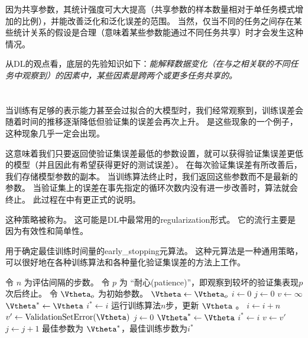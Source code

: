 因为共享参数，其统计强度可大大提高（共享参数的样本数量相对于单任务模式增加的比例），并能改善泛化和泛化误差的范围\citep{baxter95a}。
当然，仅当不同的任务之间存在某些统计关系的假设是合理（意味着某些参数能通过不同任务共享）时才会发生这种情况。

从\gls{DL}的观点看，底层的先验知识如下：\emph{能解释数据变化（在与之相关联的不同任务中观察到）的因素中，某些因素是跨两个或更多任务共享的。}


\section{}
\label{sec:early_stopping}
当训练有足够的表示能力甚至会过拟合的大模型时，我们经常观察到，训练误差会随着时间的推移逐渐降低但验证集的误差会再次上升。
是这些现象的一个例子，这种现象几乎一定会出现。


这意味着我们只要返回使验证集误差最低的参数设置，就可以获得验证集误差更低的模型（并且因此有希望获得更好的测试误差）。
在每次验证集误差有所改善后，我们存储模型参数的副本。
当训练算法终止时，我们返回这些参数而不是最新的参数。
当验证集上的误差在事先指定的循环次数内没有进一步改善时，算法就会终止。
此过程在中有更正式的说明。



这种策略被称为。
这可能是\gls{DL}中最常用的\gls{regularization}形式。
它的流行主要是因为有效性和简单性。

\begin{algorithm}[ht]
\caption{用于确定最佳训练时间量的\gls{early_stopping}元算法。
这种元算法是一种通用策略，可以很好地在各种训练算法和各种量化验证集误差的方法上工作。
}
\label{alg:early_stopping}
\begin{algorithmic}
\STATE 令 $n$ 为评估间隔的步数。
\STATE 令 $p$ 为 ``耐心(patience)''，即观察到较坏的验证集表现$p$次后终止。 
\STATE 令 $\Vtheta_{o}$ 为初始参数。
\STATE $\Vtheta \leftarrow \Vtheta_{o}$
\STATE $i \leftarrow 0$
\STATE $j \leftarrow 0$
\STATE $v \leftarrow \infty$
\STATE $\Vtheta^* \leftarrow \Vtheta$
\STATE $i^* \leftarrow i$
    \STATE 运行训练算法$n$步，更新 $\Vtheta$ 。
    \STATE $i \leftarrow i + n$
    \STATE $v' \leftarrow \text{ValidationSetError}(\Vtheta)$
        \STATE $j \leftarrow 0$
        \STATE $\Vtheta^* \leftarrow \Vtheta$
        \STATE $i^* \leftarrow i$
        \STATE $v \leftarrow v'$
    \ELSE
        \STATE $j \leftarrow j + 1$
    \ENDIF
\ENDWHILE
\STATE 最佳参数为 $\Vtheta^*$，最佳训练步数为$i^*$
\end{algorithmic}
\end{algorithm}


